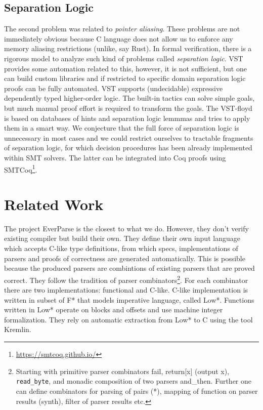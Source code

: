 \documentclass[acmsmall,nonacm]{acmart}
\begin{document}
\subsection{Separation Logic}

The second problem was related to \textit{pointer aliasing}. These problems are not immediately obvious because C language does not allow us to enforce any memory aliasing restrictions (unlike, say Rust). In formal verification, there is a rigorous model to analyze such kind of problems called \textit{separation logic}. VST provides some automation related to this, however, it is not sufficient, but one can build custom libraries and if restricted to specific domain separation logic proofs can be fully automated. VST supports (undecidable) expressive dependently typed higher-order logic. The built-in tactics can solve simple goals, but much manual proof effort is required to transform the goals. The VST-floyd is based on databases of hints and separation logic lemmmas and tries to apply them in a smart way. We conjecture that the full force of separation logic is unnecessary in most cases and we could restrict ourselves to tractable fragments of separation logic, for which decision procedures has been already implemented within SMT solvers. The latter can be integrated into Coq proofs using SMTCoq\footnote{\url{https://smtcoq.github.io/}}.


\section{Related Work}


The project EverParse is the closest to what we do. However, they
don't verify existing compiler but build their own. They define their
own input language which accepts C-like type definitions, from which
specs, implementations of parsers and proofs of correctness are
generated automatically. This is possible because the produced parsers
are combintions of existing parsers that are proved correct. They
follow the tradition of parser combinators\footnote{Starting with
  primitive parser combinators fail, return[x] (output x),
  \texttt{read\_byte}, and monadic composition of two parsers
  and\_then. Further one can define combinators for parsing of pairs
  (*), mapping of function on parser results (synth), filter of parser
  results etc.}. For each combinator there are two implementations:
functional and C-like. C-like implementation is written in subset of
F* that models imperative language, called Low*. Functions written in
Low* operate on blocks and offsets and use machine integer
formalization. They rely on automatic extraction from Low* to C using
the tool Kremlin.
\end{document}
